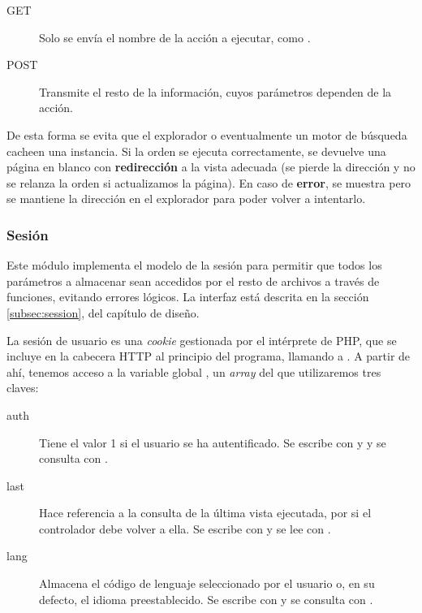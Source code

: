\begin{description}
	\item[GET] Solo se envía el nombre de la acción a ejecutar, como .
	\item[POST] Transmite el resto de la información, cuyos parámetros dependen de la acción.
\end{description}

De esta forma se evita que el explorador o eventualmente un motor de búsqueda cacheen una instancia. Si la orden se ejecuta correctamente, se devuelve una página en blanco con \textbf{redirección} a la vista adecuada (se pierde la dirección y no se relanza la orden si actualizamos la página). En caso de \textbf{error}, se muestra pero se mantiene la dirección en el explorador para poder volver a intentarlo.

\subsubsection{Sesión}

Este módulo implementa el modelo de la sesión para permitir que todos los parámetros a almacenar sean accedidos por el resto de archivos a través de funciones, evitando errores lógicos. La interfaz está descrita en la sección \ref{subsec:session}, del capítulo de diseño.

La sesión de usuario es una \textit{cookie} gestionada por el intérprete de PHP, que se incluye en la cabecera \acrshort{HTTP} al principio del programa, llamando a . A partir de ahí, tenemos acceso a la variable global , un \textit{array} del que utilizaremos tres claves:

\begin{description}
	\item[auth] Tiene el valor 1 si el usuario se ha autentificado. Se escribe con  y  y se consulta con .
	
	\item[last] Hace referencia a la consulta de la última vista ejecutada, por si el controlador debe volver a ella. Se escribe con  y se lee con .
	
	\item[lang] Almacena el código de lenguaje seleccionado por el usuario o, en su defecto, el idioma preestablecido. Se escribe con  y se consulta con .
\end{description}

